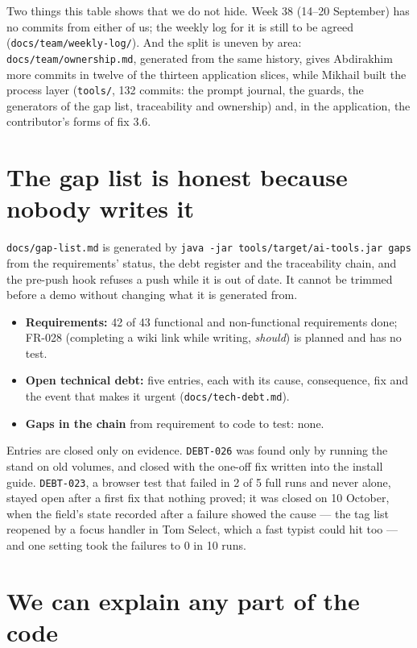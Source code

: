 \documentclass[11pt]{article}
\begin{document}
Two things this table shows that we do not hide. Week 38 (14--20 September) has no commits from
either of us; the weekly log for it is still to be agreed (\texttt{docs/team/weekly-log/}). And the
split is uneven by area: \texttt{docs/team/ownership.md}, generated from the same history, gives
Abdirakhim more commits in twelve of the thirteen application slices, while Mikhail built the
process layer (\texttt{tools/}, 132 commits: the prompt journal, the guards, the generators of the
gap list, traceability and ownership) and, in the application, the contributor's forms of fix 3.6.

\section{The gap list is honest because nobody writes it}

\texttt{docs/gap-list.md} is generated by \texttt{java -jar tools/target/ai-tools.jar gaps} from the
requirements' status, the debt register and the traceability chain, and the pre-push hook refuses a
push while it is out of date. It cannot be trimmed before a demo without changing what it is
generated from.

\begin{itemize}
\item \textbf{Requirements:} 42 of 43 functional and non-functional requirements done; FR-028
  (completing a wiki link while writing, \emph{should}) is planned and has no test.
\item \textbf{Open technical debt:} five entries, each with its cause, consequence, fix and the
  event that makes it urgent (\texttt{docs/tech-debt.md}).
\item \textbf{Gaps in the chain} from requirement to code to test: none.
\end{itemize}

Entries are closed only on evidence. \texttt{DEBT-026} was found only by running the stand on old
volumes, and closed with the one-off fix written into the install guide. \texttt{DEBT-023}, a
browser test that failed in 2 of 5 full runs and never alone, stayed open after a first fix that
nothing proved; it was closed on 10 October, when the field's state recorded after a failure showed
the cause --- the tag list reopened by a focus handler in Tom Select, which a fast typist could hit
too --- and one setting took the failures to 0 in 10 runs.

\section{We can explain any part of the code}
\end{document}
